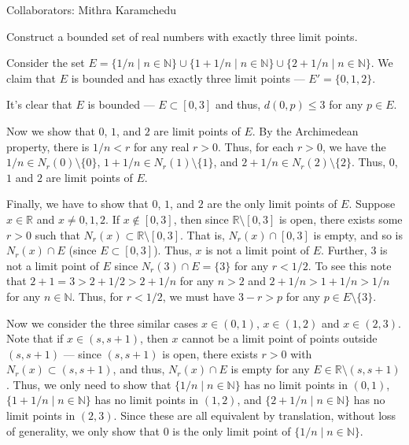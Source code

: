 \documentclass[12 pt, letterpaper]{hmcpset}
\begin{document}
Collaborators: Mithra Karamchedu

\begin{problem}
	Construct a bounded set of real numbers with exactly three limit points.
\end{problem}

\begin{solution}
	Consider the set $E = \{ 1/n \mid n \in \mathbb{N} \} \cup \{ 1 + 1/n \mid n \in \mathbb{N} \} \cup \{ 2 + 1/n \mid n \in \mathbb{N} \}$. We claim that $E$ is bounded and has exactly three limit points --- $E' = \{ 0, 1, 2 \}$.

	It's clear that $E$ is bounded --- $E \subset [0, 3]$ and thus, $d(0, p) \le 3$ for any $p \in E$.

	Now we show that $0$, $1$, and $2$ are limit points of $E$. By the Archimedean property, there is $1/n < r$ for any real $r > 0$. Thus, for each $r > 0$, we have the $1/n \in N_{r}(0) \setminus \{ 0 \}$, $1 + 1/n \in N_{r}(1) \setminus \{ 1 \}$, and $2 + 1/n \in N_{r}(2) \setminus \{ 2 \}$. Thus, $0$, $1$ and $2$ are limit points of $E$.

	Finally, we have to show that $0$, $1$, and $2$ are the only limit points of $E$. Suppose $x \in \mathbb{R}$ and $x \neq 0, 1, 2$. If $x \notin [0, 3]$, then since $\mathbb{R} \setminus [0, 3]$ is open, there exists some $r > 0$ such that $N_{r}(x) \subset \mathbb{R} \setminus [0, 3]$. That is, $N_{r}(x) \cap [0, 3]$ is empty, and so is $N_{r}(x) \cap E$ (since $E \subset [0, 3]$). Thus, $x$ is not a limit point of $E$. Further, $3$ is not a limit point of $E$ since $N_{r}(3) \cap E = \{ 3 \}$ for any $r < 1/2$. To see this note that $2 + 1 = 3 > 2 + 1/2 > 2 + 1/n$ for any $n > 2$ and $2 + 1/n > 1 + 1/n > 1/n$ for any $n \in \mathbb{N}$. Thus, for $r < 1/2$, we must have $3 - r > p$ for any $p \in E \setminus \{ 3 \}$.

	Now we consider the three similar cases $x \in (0, 1)$, $x \in (1, 2)$ and $x \in (2, 3)$. Note that if $x \in (s, s + 1)$, then $x$ cannot be a limit point of points outside $(s, s + 1)$ --- since $(s, s + 1)$ is open, there exists  $r > 0$ with $N_{r}(x) \subset (s, s + 1)$, and thus, $N_{r}(x) \cap E$ is empty for any $E \in \mathbb{R} \setminus (s, s + 1)$. Thus, we only need to show that $\{ 1/n \mid n \in \mathbb{N} \}$ has no limit points in $(0, 1)$, $\{ 1 + 1/n \mid n \in \mathbb{N} \}$ has no limit points in $(1, 2)$, and $\{ 2 + 1/n \mid n \in \mathbb{N} \}$ has no limit points in $(2, 3)$. Since these are all equivalent by translation, without loss of generality, we only show that $0$ is the only limit point of $\{ 1/n \mid n \in \mathbb{N} \}$.


\end{solution}
\end{document}
